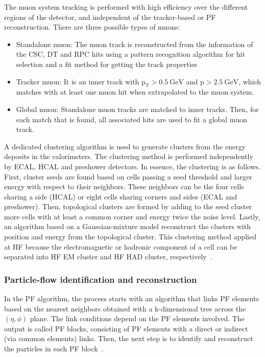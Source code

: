 The muon system tracking is performed with high efficiency over the different regions of the detector, and independent of the tracker-based or PF reconstruction. There are three possible types of muons:
\begin{itemize}
    \item Standalone muon: The muon track is reconstructed from the information of the CSC, DT and RPC hits using a pattern recognition algorithm for hit selection and a fit method for getting the track properties
    \item Tracker muon: It is an inner track with $\mathrm{p_{T}>0.5~GeV}$ and $\mathrm{p>2.5~GeV}$, which matches with at least one muon hit when extrapolated to the muon system.
    \item Global muon: Standalone muon tracks are matched to inner tracks. Then, for each match that is found, all associated hits are used to fit a global muon track. 
\end{itemize}
A dedicated clustering algorithm is used to generate clusters from the energy deposits in the calorimeters. The clustering method is performed independently by ECAL, HCAL and preshower detectors. In essence, the clustering is as follows. First, cluster seeds are found based on cells passing a seed threshold and larger energy with respect to their neighbors. These neighbors can be the four cells sharing a side (HCAL) or eight cells sharing corners and sides (ECAL and preshower). Then, topological clusters are formed by adding to the seed cluster more cells with at least a common corner and energy twice the noise level. Lastly, an algorithm based on a Gaussian-mixture model reconstruct the clusters with position and energy from the topological cluster. This clustering method applied at HF because the electromagnetic or hadronic component of a cell can be separated into HF EM cluster and HF HAD cluster, respectively~\cite{cmspfalgo}. 

\subsubsection{Particle-flow identification and reconstruction}

In the PF algorithm, the process starts with an algorithm that links PF elements based on the nearest neighbors obtained with a k-dimensional tree across the $(\eta,\phi)$ plane. The link conditions depend on the PF elements involved. The output is called PF blocks, consisting of PF elements with a direct or indirect (via common elements) links. Then, the next step is to identify and reconstruct the particles in each PF block~\cite{cmspfalgo}. 

